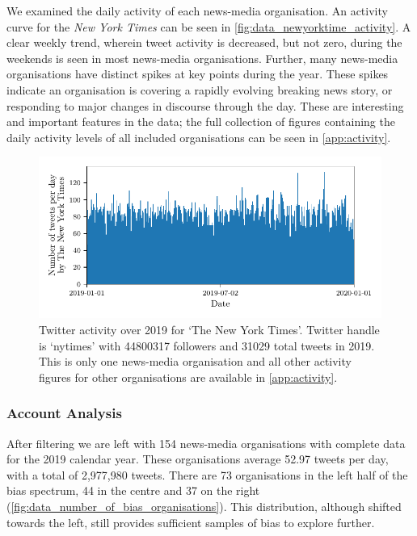 We examined the daily activity of each news-media organisation. An activity curve for the \emph{New York Times} can be seen in \autoref{fig:data_newyorktime_activity}. 
A clear weekly trend, wherein tweet activity is decreased, but not zero, during the weekends is seen in most news-media organisations. Further, many news-media organisations have distinct spikes at key points during the year. These spikes indicate an organisation is covering a rapidly evolving breaking news story, or responding to major changes in discourse through the day. These are interesting and important features in the data; the full collection of figures containing the daily activity levels of all included organisations can be seen in \autoref{app:activity}.

\begin{figure}[!htbp]
\centering
	\includegraphics{chapter1/figs/tweet_times_nytimes.pdf}
	\caption{Twitter activity over 2019 for `The New York Times'.
		Twitter handle is `nytimes' with 44800317 followers and 31029 total tweets in 2019. This is only one news-media organisation and all other activity figures for other organisations are available in \autoref{app:activity}.}
	\label{fig:data_newyorktime_activity}
\end{figure}


\subsubsection{Account Analysis}
After filtering we are left with 154 news-media organisations with complete data for the 2019 calendar year. %
These organisations average 52.97 tweets per day, with a total of 2,977,980 tweets.
There are 73 organisations in the left half of the bias spectrum, 44 in the centre and 37 on the right (\autoref{fig:data_number_of_bias_organisations}). This distribution, although shifted towards the left, still provides sufficient samples of bias to explore further.

